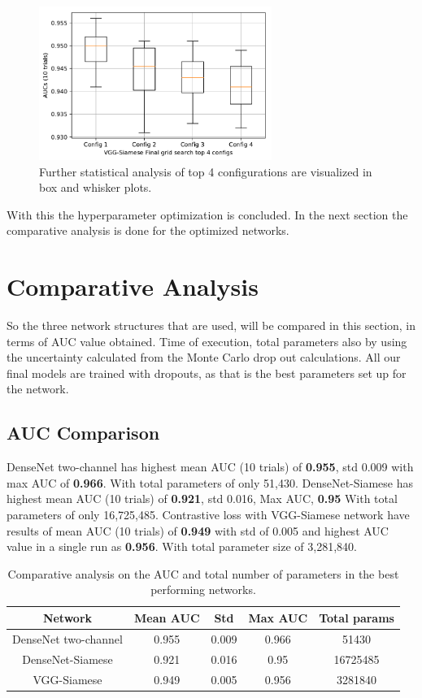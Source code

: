 \begin{figure}[ht]
\centering
\includegraphics[height= 5cm]{images/contrastive/top_config_boxplot}
\caption{Further statistical analysis of top 4 configurations are visualized in box and whisker plots.}
\label{fig:top_config_boxplot_contrastive}
\end{figure}

\vspace{1.5cm}
With this the hyperparameter optimization is concluded. In the next section the comparative analysis is done for the optimized networks.

\flushbottom
\newpage

\section{Comparative Analysis}
So the three network structures that are used, will be compared in this section, in terms of AUC value obtained. Time of execution, total parameters also by using the uncertainty calculated from the Monte Carlo 
drop out calculations. All our final models are trained with dropouts, as that is the best parameters set up for the network. 

\subsection{AUC Comparison}
DenseNet two-channel has highest mean AUC (10 trials) of \textbf{0.955}, std 0.009 with max AUC of \textbf{0.966}. With total parameters of only 51,430. 
DenseNet-Siamese has highest mean AUC (10 trials) of \textbf{0.921}, std 0.016, Max AUC, \textbf{0.95} With total parameters of only 16,725,485. 
Contrastive loss with VGG-Siamese network have results of mean AUC (10 trials) of \textbf{0.949} with std of 0.005 and highest AUC value in a single run as \textbf{0.956}. With total parameter size of 3,281,840.

\begin{table}[ht]
\centering
\caption{Comparative analysis on the AUC and total number of parameters in the best performing networks.}
\begin{tabular}{|c c c c c|} 
\rowcolor{lightgrey}
 \hline\hline
 Network & Mean AUC & Std & Max AUC & Total params\\ \hline
 DenseNet two-channel & 0.955 & 0.009 & 0.966 & 51430\\
 DenseNet-Siamese & 0.921 & 0.016 & 0.95 & 16725485 \\
 VGG-Siamese & 0.949 & 0.005 & 0.956 & 3281840\\ \hline \hline
 \end{tabular}
\label{table:comparative_auc_results}
\end{table}

